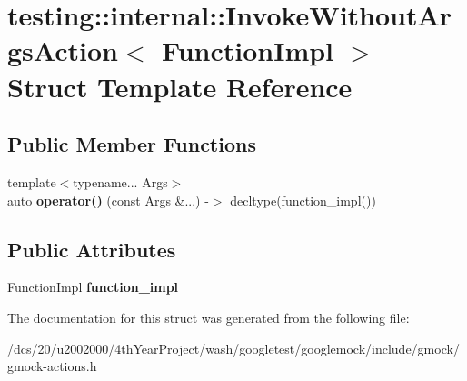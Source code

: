 \hypertarget{structtesting_1_1internal_1_1InvokeWithoutArgsAction}{}\section{testing\+:\+:internal\+:\+:Invoke\+Without\+Args\+Action$<$ Function\+Impl $>$ Struct Template Reference}
\label{structtesting_1_1internal_1_1InvokeWithoutArgsAction}
\subsection*{Public Member Functions}
\begin{DoxyCompactItemize}
\item 
\mbox{\label{structtesting_1_1internal_1_1InvokeWithoutArgsAction_adc01090fc14c0e63b1ed81e8a0d04fc4}} 
{\footnotesize template$<$typename... Args$>$ }\\auto {\bfseries operator()} (const Args \&...) -\/$>$ decltype(function\+\_\+impl())
\end{DoxyCompactItemize}
\subsection*{Public Attributes}
\begin{DoxyCompactItemize}
\item 
\mbox{\label{structtesting_1_1internal_1_1InvokeWithoutArgsAction_a60320725a70c43f3257264ffc905fd71}} 
Function\+Impl {\bfseries function\+\_\+impl}
\end{DoxyCompactItemize}


The documentation for this struct was generated from the following file\+:\begin{DoxyCompactItemize}
\item 
/dcs/20/u2002000/4th\+Year\+Project/wash/googletest/googlemock/include/gmock/gmock-\/actions.\+h\end{DoxyCompactItemize}
